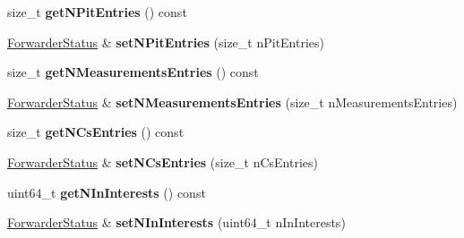 \begin{DoxyCompactItemize}
\item 
size\+\_\+t {\bfseries get\+N\+Pit\+Entries} () const\hypertarget{classndn_1_1nfd_1_1ForwarderStatus_a129cb39e548b8a9abd56b7cfd4c1dc7d}{}\label{classndn_1_1nfd_1_1ForwarderStatus_a129cb39e548b8a9abd56b7cfd4c1dc7d}

\item 
\hyperlink{classndn_1_1nfd_1_1ForwarderStatus}{Forwarder\+Status} \& {\bfseries set\+N\+Pit\+Entries} (size\+\_\+t n\+Pit\+Entries)\hypertarget{classndn_1_1nfd_1_1ForwarderStatus_a397e52c6776750a96586c28a1bac920d}{}\label{classndn_1_1nfd_1_1ForwarderStatus_a397e52c6776750a96586c28a1bac920d}

\item 
size\+\_\+t {\bfseries get\+N\+Measurements\+Entries} () const\hypertarget{classndn_1_1nfd_1_1ForwarderStatus_a738695471a1a2dc938b09fa644f99bc1}{}\label{classndn_1_1nfd_1_1ForwarderStatus_a738695471a1a2dc938b09fa644f99bc1}

\item 
\hyperlink{classndn_1_1nfd_1_1ForwarderStatus}{Forwarder\+Status} \& {\bfseries set\+N\+Measurements\+Entries} (size\+\_\+t n\+Measurements\+Entries)\hypertarget{classndn_1_1nfd_1_1ForwarderStatus_acf0238b61304a525c75f2b5d7d228e5d}{}\label{classndn_1_1nfd_1_1ForwarderStatus_acf0238b61304a525c75f2b5d7d228e5d}

\item 
size\+\_\+t {\bfseries get\+N\+Cs\+Entries} () const\hypertarget{classndn_1_1nfd_1_1ForwarderStatus_a01055a923a2d6ae9dd5d61b6621b25a0}{}\label{classndn_1_1nfd_1_1ForwarderStatus_a01055a923a2d6ae9dd5d61b6621b25a0}

\item 
\hyperlink{classndn_1_1nfd_1_1ForwarderStatus}{Forwarder\+Status} \& {\bfseries set\+N\+Cs\+Entries} (size\+\_\+t n\+Cs\+Entries)\hypertarget{classndn_1_1nfd_1_1ForwarderStatus_a08d394305f25703d1b909ac39fcbaef3}{}\label{classndn_1_1nfd_1_1ForwarderStatus_a08d394305f25703d1b909ac39fcbaef3}

\item 
uint64\+\_\+t {\bfseries get\+N\+In\+Interests} () const\hypertarget{classndn_1_1nfd_1_1ForwarderStatus_ace76960d86ce1530d6e60727adbab72e}{}\label{classndn_1_1nfd_1_1ForwarderStatus_ace76960d86ce1530d6e60727adbab72e}

\item 
\hyperlink{classndn_1_1nfd_1_1ForwarderStatus}{Forwarder\+Status} \& {\bfseries set\+N\+In\+Interests} (uint64\+\_\+t n\+In\+Interests)\hypertarget{classndn_1_1nfd_1_1ForwarderStatus_a92eaf16ffeda5a8c85fdb82938870ce0}{}\label{classndn_1_1nfd_1_1ForwarderStatus_a92eaf16ffeda5a8c85fdb82938870ce0}


\end{DoxyCompactItemize}
